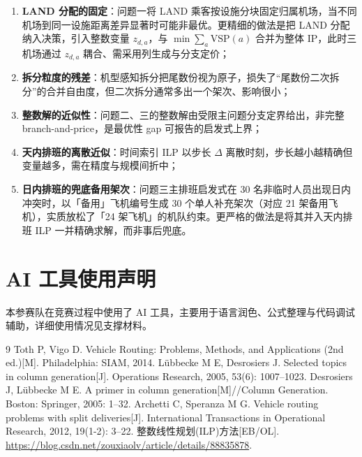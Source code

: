 \documentclass[UTF8,zihao=-4]{ctexart}
\numberwithin{figure}{section}
\numberwithin{table}{section}
\begin{document}
\begin{enumerate}
  \item \textbf{LAND 分配的固定}：问题一将 LAND 乘客按设施分块固定归属机场，当不同机场到同一设施距离差异显著时可能非最优。更精细的做法是把 LAND 分配纳入决策，引入整数变量 $z_{d,a}$，与 $\min\sum_a\mathrm{VSP}(a)$ 合并为整体 IP，此时三机场通过 $z_{d,a}$ 耦合、需采用列生成与分支定价；
  \item \textbf{拆分粒度的残差}：机型感知拆分把尾数份视为原子，损失了“尾数份二次拆分”的合并自由度，但二次拆分通常多出一个架次、影响很小；
  \item \textbf{整数解的近似性}：问题二、三的整数解由受限主问题分支定界给出，非完整 branch-and-price，是最优性 gap 可报告的启发式上界；
  \item \textbf{天内排班的离散近似}：时间索引 ILP 以步长 $\Delta$ 离散时刻，步长越小越精确但变量越多，需在精度与规模间折中；
  \item \textbf{日内排班的兜底备用架次}：问题三主排班启发式在 30 名非临时人员出现日内冲突时，以「备用」飞机编号生成 30 个单人补充架次（对应 21 架备用飞机），实质放松了「24 架飞机」的机队约束。更严格的做法是将其并入天内排班 ILP 一并精确求解，而非事后兜底。
\end{enumerate}

\section*{AI 工具使用声明}

本参赛队在竞赛过程中使用了 AI 工具，主要用于语言润色、公式整理与代码调试辅助，详细使用情况见支撑材料。

\begin{thebibliography}{9}
 Toth P, Vigo D. Vehicle Routing: Problems, Methods, and Applications (2nd ed.)[M]. Philadelphia: SIAM, 2014.
 L{\"u}bbecke M E, Desrosiers J. Selected topics in column generation[J]. Operations Research, 2005, 53(6): 1007--1023.
 Desrosiers J, L{\"u}bbecke M E. A primer in column generation[M]//Column Generation. Boston: Springer, 2005: 1--32.
 Archetti C, Speranza M G. Vehicle routing problems with split deliveries[J]. International Transactions in Operational Research, 2012, 19(1-2): 3--22.
 整数线性规划(ILP)方法[EB/OL]. \url{https://blog.csdn.net/zouxiaolv/article/details/88835878}.
\end{thebibliography}
\end{document}
